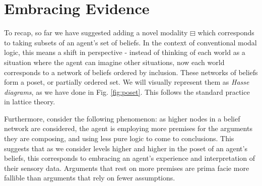 \documentclass[11pt,titlepage]{report}
\numberwithin{equation}{subsection}
\renewcommand\subsection{\section}
\newcommand{\BM}{\boxminus}
\begin{document}

\subsection{Embracing Evidence}\label{quine}
To recap, so far we
have suggested adding a novel modality $\BM$ which corresponds to
taking subsets of an agent's set of beliefs.  In the context of
conventional modal logic, this means a shift in perspective - instead
of thinking of each world as a situation where the agent can imagine
other situations, now each world corresponds to a network of beliefs
ordered by inclusion. These networks of beliefs form a poset, or
partially ordered set.  We will visually represent them as
\emph{Hasse diagrams}, as we have done in Fig. \ref{fig:poset}. 
This follows the standard practice in lattice theory. 

Furthermore, consider the following phenomenon: as higher
nodes in a belief network are considered, the agent is employing more
premises for the arguments they are composing, and using less pure
logic to come to conclusions.  This suggests that as we consider levels higher and higher in the poset of
an agent's beliefs, this corresponds to embracing an agent's
experience and interpretation of their sensory data.  Arguments
that rest on more premises are prima facie more fallible than
arguments that rely on fewer assumptions.
\end{document}
